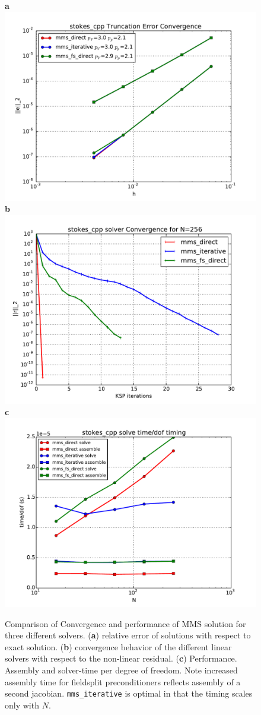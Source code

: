 \begin{figure}[htbp!]
  \centering
 \textbf{a} \includegraphics[width=.65\textwidth]{figures/stokes_cpp_mms_convergence.pdf}\\
\textbf{b}\includegraphics[width=.65\textwidth]{figures/stokes_cpp_ksp_convergence.pdf}\\
\textbf{c}\includegraphics[width=.65\textwidth]{figures/stokes_cpp_compare_normalized_solver_timing.pdf}\\
  \caption{Comparison of Convergence and performance of MMS solution
    for three different solvers.  (\textbf{a}) relative error of
    solutions with respect to exact solution. (\textbf{b}) convergence behavior
    of the different linear solvers with respect to  the non-linear
    residual. (\textbf{c}) Performance.  Assembly and solver-time per
    degree of freedom.  Note increased assembly time for fieldsplit
    preconditioners reflects assembly of a second jacobian.
    \texttt{mms\_iterative} is optimal in that the timing scales only
    with $N$.}
  \label{fig:stokes_solver_convergence_timing}
\end{figure}

